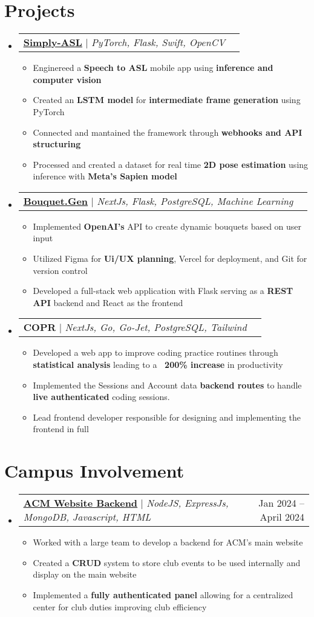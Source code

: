 \documentclass[letterpaper,11pt]{article}
\makeatletter
\newcommand{\resumeItem}[1]{
  \item\small{
    {#1 \vspace{-2pt}}
  }
}
\newcommand{\resumeProjectHeading}[2]{
    \item
    \begin{tabular*}{0.97\textwidth}{l@{\extracolsep{\fill}}r}
      \small#1 & #2 \\
    \end{tabular*}\vspace{-7pt}
}
\newcommand{\resumeSubHeadingListStart}{\begin{itemize}[leftmargin=0.15in, label={}]}
\newcommand{\resumeSubHeadingListEnd}{\end{itemize}}
\newcommand{\resumeItemListStart}{\begin{itemize}}
\newcommand{\resumeItemListEnd}{\end{itemize}\vspace{-5pt}}
\makeatother
\begin{document}
\section{Projects}
    \resumeSubHeadingListStart
    \resumeProjectHeading
          {\href{https://github.com/DRobinson4105/Simply-ASL}{\underline{{\textbf{Simply-ASL}}}} $|$ \emph{PyTorch, Flask, Swift, OpenCV}}{}
          \resumeItemListStart
            \resumeItem{Enginereed a \textbf{Speech to ASL} mobile app using \textbf{inference and computer vision}}
            \resumeItem{Created an \textbf{LSTM model} for \textbf{intermediate frame generation} using PyTorch}
            \resumeItem{Connected and mantained the framework through \textbf{webhooks and API structuring}}
            \resumeItem{Processed and created a dataset for real time \textbf{2D pose estimation} using inference with \textbf{Meta's Sapien model}}
          \resumeItemListEnd
      \resumeProjectHeading
           {\href{https://bouquetgen.vercel.app/}{\underline{{\textbf{Bouquet.Gen}}}} $|$ \emph{NextJs, Flask, PostgreSQL, Machine Learning}}{}
          \resumeItemListStart
              \resumeItem{Implemented \textbf{OpenAI's} API to create dynamic bouquets based on user input}
            \resumeItem{Utilized Figma for \textbf{Ui/UX planning}, Vercel for deployment, and Git for version control}
            \resumeItem{Developed a full-stack web application with Flask serving as a\textbf{ REST API} backend and React as the frontend}
          \resumeItemListEnd
      \resumeProjectHeading
          {\textbf{COPR} $|$ \emph{NextJs, Go, Go-Jet, PostgreSQL, Tailwind}}{}
          \resumeItemListStart
          \resumeItem{Developed a web app to improve coding practice routines through \textbf{statistical analysis} leading to a \textbf{~200\% increase} in productivity} 
          \resumeItem{Implemented the Sessions and Account data \textbf{backend routes} to handle \textbf{live authenticated} coding sessions.}
          \resumeItem{Lead frontend developer responsible for designing and implementing the frontend in full}
            
            
            
          \resumeItemListEnd

    \resumeSubHeadingListEnd

\section{Campus Involvement}
    \resumeSubHeadingListStart
      \resumeProjectHeading
          {\href{https://www.acmucf.org/}{\underline{{\textbf{ACM Website Backend}}}} $|$ \emph{NodeJS, ExpressJs, MongoDB, Javascript, HTML}}{Jan 2024 -- April 2024}
          \resumeItemListStart
            \resumeItem{Worked with a large team to develop a backend for ACM's main website}
            \resumeItem{Created a \textbf{CRUD} system to store club events to be used internally and display on the main website}
            \resumeItem{Implemented a \textbf{fully authenticated panel} allowing for a centralized center for club duties improving club efficiency}
          \resumeItemListEnd
      \resumeSubHeadingListEnd 
\end{document}
